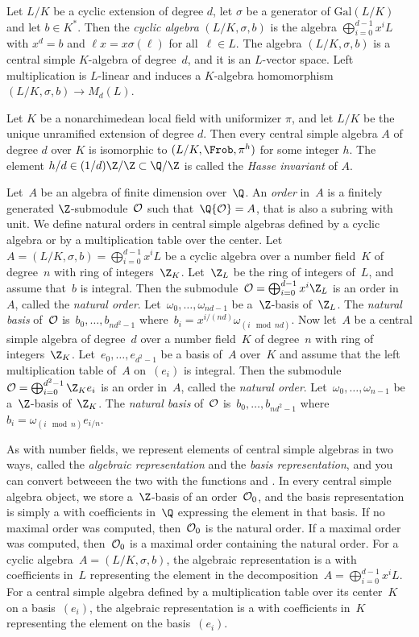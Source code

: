 Let $L/K$ be a cyclic extension of degree $d$, let $\sigma$ be a
generator of $\text{Gal}(L/K)$ and let $b\in K^*$. Then the
\emph{cyclic algebra} $(L/K,\sigma,b)$ is the algebra
$\bigoplus_{i=0}^{d-1}x^iL$ with $x^d=b$ and $\ell x=x\sigma(\ell)$ for
all~$\ell\in L$. The algebra $(L/K,\sigma,b)$ is a central simple $K$-algebra
of degree~$d$, and it is an $L$-vector space. Left multiplication is
$L$-linear and induces a $K$-algebra homomorphism $(L/K,\sigma,b)\to M_d(L)$.

Let $K$ be a nonarchimedean local field with uniformizer $\pi$, and let
$L/K$ be the unique unramified extension of degree $d$. Then every central
simple algebra $A$ of degree $d$ over $K$ is isomorphic to
$(L/K, \Frob, \pi^h)$ for some integer $h$. The element $h/d\in
(1/d)\Z/\Z\subset\Q/\Z$ is called the \emph{Hasse invariant} of $A$.

Let~$A$ be an algebra of finite dimension over~$\Q$. An \emph{order}
in~$A$ is a finitely generated $\Z$-submodule~${\cal O}$ such
that~$\Q{\cal O} = A$, that is also a subring with unit. We define natural
orders in central simple algebras defined by a cyclic algebra or by a
multiplication table over the center. Let~$A = (L/K,\sigma,b) =
\bigoplus_{i=0}^{d-1}x^iL$ be a cyclic algebra over a number field~$K$ of
degree~$n$ with ring of integers~$\Z_K$. Let~$\Z_L$ be the ring of integers
of~$L$, and assume that~$b$ is integral. Then the submodule~${\cal O} =
\bigoplus_{i=0}^{d-1}x^i\Z_L$ is an order in~$A$, called the
\emph{natural order}. Let~$\omega_0,\dots,\omega_{nd-1}$ be a~$\Z$-basis
of~$\Z_L$. The \emph{natural basis} of~${\cal O}$ is~$b_0,\dots,b_{nd^2-1}$
where~$b_i = x^{i/(nd)}\omega_{(i \mod nd)}$. Now let~$A$ be a central simple
algebra of degree~$d$ over a number field~$K$ of degree~$n$ with ring of
integers~$\Z_K$. Let~$e_0,\dots,e_{d^2-1}$ be a basis of~$A$ over~$K$ and
assume that the left multiplication table of~$A$ on~$(e_i)$ is integral. Then
the submodule~${\cal O} = \bigoplus_{i=0}^{d^2-1}\Z_K e_i$ is an order
in~$A$, called the \emph{natural order}. Let~$\omega_0,\dots,\omega_{n-1}$ be
a~$\Z$-basis of~$\Z_K$. The \emph{natural basis} of~${\cal O}$
is~$b_0,\dots,b_{nd^2-1}$ where~$b_i = \omega_{(i \mod n)}e_{i/n}$.

As with number fields, we represent elements of central simple algebras
in two ways, called the \emph{algebraic representation} and the \emph{basis
representation}, and you can convert betweeen the two with the functions
 and . In every central simple algebra
object, we store a~$\Z$-basis of an order~${\cal O}_0$, and the basis
representation is simply a  with coefficients in~$\Q$ expressing the
element in that basis. If no maximal order was computed, then~${\cal O}_0$ is
the natural order. If a maximal order was computed, then~${\cal O}_0$ is a
maximal order containing the natural order. For a cyclic algebra~$A =
(L/K,\sigma,b)$, the algebraic representation is a  with coefficients
in~$L$ representing the element in the decomposition~$A =
\bigoplus_{i=0}^{d-1}x^iL$. For a central simple algebra defined by a
multiplication table over its center~$K$ on a basis~$(e_i)$, the algebraic
representation is a  with coefficients in~$K$ representing the element
on the basis~$(e_i)$.

